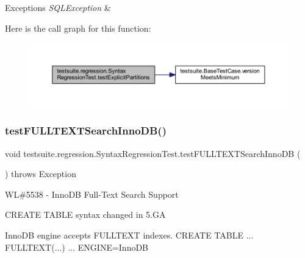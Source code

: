 \begin{DoxyExceptions}{Exceptions}
{\em S\+Q\+L\+Exception} & \\
\hline
\end{DoxyExceptions}
Here is the call graph for this function\+:
\nopagebreak
\begin{figure}[H]
\begin{center}
\leavevmode
\includegraphics[width=350pt]{classtestsuite_1_1regression_1_1_syntax_regression_test_a4aacde39fa83ec7ba0436c5eb372a98d_cgraph}
\end{center}
\end{figure}
\mbox{\label{classtestsuite_1_1regression_1_1_syntax_regression_test_ab17b59b494fc9088d01ed9da04095161}} 
\subsubsection{\texorpdfstring{test\+F\+U\+L\+L\+T\+E\+X\+T\+Search\+Inno\+D\+B()}{testFULLTEXTSearchInnoDB()}}
{\footnotesize\ttfamily void testsuite.\+regression.\+Syntax\+Regression\+Test.\+test\+F\+U\+L\+L\+T\+E\+X\+T\+Search\+Inno\+DB (\begin{DoxyParamCaption}{ }\end{DoxyParamCaption}) throws Exception}

WL\#5538 -\/ Inno\+DB Full-\/\+Text Search Support

C\+R\+E\+A\+TE T\+A\+B\+LE syntax changed in 5.\+GA

Inno\+DB engine accepts F\+U\+L\+L\+T\+E\+XT indexes. C\+R\+E\+A\+TE T\+A\+B\+LE ... F\+U\+L\+L\+T\+E\+XT(...) ... E\+N\+G\+I\+NE=Inno\+DB



